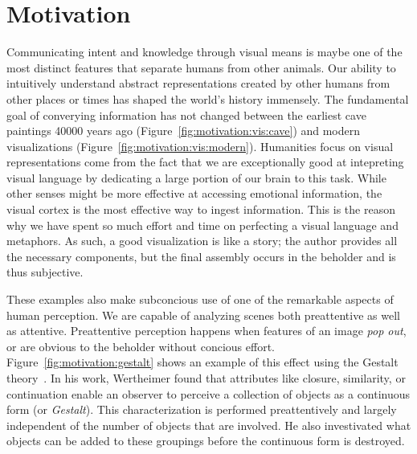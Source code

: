 \chapter{Motivation} \label{cha:motivation}
Communicating intent and knowledge through visual means is maybe one of the most distinct features that separate humans from other animals. Our ability to intuitively understand abstract representations created by other humans from other places or times has shaped the world's history immensely.  The fundamental goal of converying information has not changed between the earliest cave paintings 40000 years ago (Figure~\ref{fig:motivation:vis:cave}) and modern visualizations (Figure~\ref{fig:motivation:vis:modern}).  Humanities focus on visual representations come from the fact that we are exceptionally good at intepreting visual language by dedicating a large portion of our brain to this task.  While other senses might be more effective at accessing emotional information, the visual cortex is the most effective way to ingest information.  This is the reason why we have spent so much effort and time on perfecting a visual language and metaphors.  As such, a good visualization is like a story; the author provides all the necessary components, but the final assembly occurs in the beholder and is thus subjective.

These examples also make subconcious use of one of the remarkable aspects of human perception.  We are capable of analyzing scenes both preattentive as well as attentive.  Preattentive perception happens when features of an image \emph{pop out}, or are obvious to the beholder without concious effort.  Figure~\ref{fig:motivation:gestalt} shows an example of this effect using the Gestalt theory~\cite{wertheimer1922untersuchungen}.  In his work, Wertheimer found that attributes like closure, similarity, or continuation enable an observer to perceive a collection of objects as a continuous form (or \emph{Gestalt}).  This characterization is performed preattentively and largely independent of the number of objects that are involved. He also investivated what objects can be added to these groupings before the continuous form is destroyed. 

